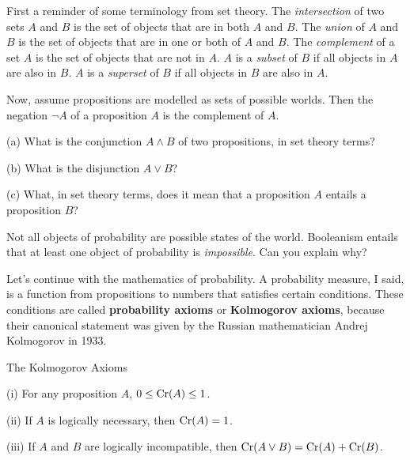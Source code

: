\begin{exercise}{1}
  First a reminder of some terminology from set theory. The \emph{intersection}
  of two sets $A$ and $B$ is the set of objects that are in both $A$ and $B$.
  The \emph{union} of $A$ and $B$ is the set of objects that are in one or both
  of $A$ and $B$. The \emph{complement} of a set $A$ is the set of objects that
  are not in $A$. $A$ is a \emph{subset} of $B$ if all objects in $A$ are also
  in $B$. $A$ is a \emph{superset} of $B$ if all objects in $B$ are also in $A$.

  Now, assume propositions are modelled as sets of possible
  worlds. Then the negation $\neg A$ of a proposition $A$ is the
  complement of $A$.
  \begin{exlist}
  \item[(a)] What is the conjunction $A \land B$ of two propositions,
    in set theory terms?
  \item[(b)] What is the disjunction $A \lor B$?
  \item[(c)] What, in set theory terms, does it mean that a proposition $A$ entails a proposition $B$?
  \end{exlist}  
  \vspace{2pt}
\end{exercise}

\begin{exercise}{2}
  Not all objects of probability are possible states of the world. Booleanism
  entails that at least one object of probability is \emph{impossible}. Can you
  explain why?
\end{exercise}

Let's continue with the mathematics of probability. A probability measure, I
said, is a function from propositions to numbers that satisfies certain
conditions. These conditions are called \textbf{probability axioms} or
\textbf{Kolmogorov axioms}, because their canonical statement was given by the
Russian mathematician Andrej Kolmogorov in 1933.
\begin{genericthm}{The Kolmogorov Axioms}
  \begin{exlist}
  \item[(i)] For any proposition $A$, $0 \leq \text{Cr}(A) \leq 1$.
  \item[(ii)] If $A$ is logically necessary, then $\text{Cr}(A) = 1$.
  \item[(iii)] If $A$ and $B$ are logically incompatible, then $\text{Cr}(A \lor B) = \text{Cr}(A) + \text{Cr}(B)$.
  \end{exlist}
\end{genericthm}


